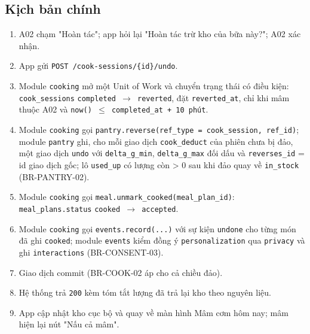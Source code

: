 \subsection{Kịch bản chính}
\begin{enumerate}
\item A02 chạm "Hoàn tác"; app hỏi lại "Hoàn tác trừ kho của bữa này?"; A02 xác nhận.
\item App gửi {\small\texttt{POST /\allowbreak{}\allowbreak{}cook-\allowbreak{}sessions/\allowbreak{}\allowbreak{}\{id\}/\allowbreak{}\allowbreak{}undo}}.
\item Module {\small\texttt{cooking}} mở một Unit of Work và chuyển trạng thái có điều kiện: {\small\texttt{cook\_\allowbreak{}\allowbreak{}sessions}} {\small\texttt{completed \ensuremath{\rightarrow} reverted}}, đặt {\small\texttt{reverted\_\allowbreak{}\allowbreak{}at}}, chỉ khi mâm thuộc A02 và {\small\texttt{now() \ensuremath{\leq} completed\_\allowbreak{}\allowbreak{}at + 10 phút}}.
\item Module {\small\texttt{cooking}} gọi {\small\texttt{pantry.\allowbreak{}reverse(ref\_\allowbreak{}\allowbreak{}type = cook\_\allowbreak{}\allowbreak{}session, ref\_\allowbreak{}\allowbreak{}id)}}; module {\small\texttt{pantry}} ghi, cho mỗi giao dịch {\small\texttt{cook\_\allowbreak{}\allowbreak{}deduct}} của phiên chưa bị đảo, một giao dịch {\small\texttt{undo}} với {\small\texttt{delta\_\allowbreak{}\allowbreak{}g\_\allowbreak{}\allowbreak{}min}}, {\small\texttt{delta\_\allowbreak{}\allowbreak{}g\_\allowbreak{}\allowbreak{}max}} đối dấu và {\small\texttt{reverses\_\allowbreak{}\allowbreak{}id}} = id giao dịch gốc; lô {\small\texttt{used\_\allowbreak{}\allowbreak{}up}} có lượng còn > 0 sau khi đảo quay về {\small\texttt{in\_\allowbreak{}\allowbreak{}stock}} (BR-\allowbreak{}PANTRY-\allowbreak{}02).
\item Module {\small\texttt{cooking}} gọi {\small\texttt{meal.\allowbreak{}unmark\_\allowbreak{}\allowbreak{}cooked(meal\_\allowbreak{}\allowbreak{}plan\_\allowbreak{}\allowbreak{}id)}}: {\small\texttt{meal\_\allowbreak{}\allowbreak{}plans.\allowbreak{}status}} {\small\texttt{cooked \ensuremath{\rightarrow} accepted}}.
\item Module {\small\texttt{cooking}} gọi {\small\texttt{events.\allowbreak{}record(.\allowbreak{}.\allowbreak{}.\allowbreak{})}} với sự kiện {\small\texttt{undone}} cho từng món đã ghi {\small\texttt{cooked}}; module {\small\texttt{events}} kiểm đồng ý {\small\texttt{personalization}} qua {\small\texttt{privacy}} và ghi {\small\texttt{interactions}} (BR-\allowbreak{}CONSENT-\allowbreak{}03).
\item Giao dịch commit (BR-\allowbreak{}COOK-\allowbreak{}02 áp cho cả chiều đảo).
\item Hệ thống trả {\small\texttt{200}} kèm tóm tắt lượng đã trả lại kho theo nguyên liệu.
\item App cập nhật kho cục bộ và quay về màn hình Mâm cơm hôm nay; mâm hiện lại nút "Nấu cả mâm".
\end{enumerate}
